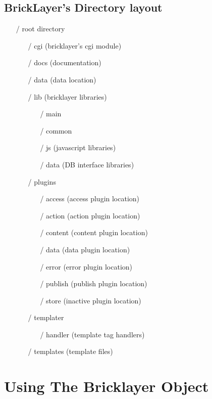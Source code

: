 \documentclass[letterpaper,10pt,oneside]{book}
\begin{document}
\subsection{BrickLayer's Directory layout}
\begin{itemize}
\item[/] root directory
\begin{itemize}
\item[/] cgi (bricklayer's cgi module)
\item[/] docs (documentation)
\item[/] data (data location)
\item[/] lib (bricklayer libraries)
	\begin{itemize}
		\item[/] main
		\item[/] common
		\item[/] js (javascript libraries)
		\item[/] data (DB interface libraries)
	\end{itemize}
\item[/] plugins
	\begin{itemize}
		\item[/] access (access plugin location)
		\item[/] action (action plugin location)
		\item[/] content (content plugin location)
		\item[/] data (data plugin location)
		\item[/] error (error plugin location)
		\item[/] publish (publish plugin location)
		\item[/] store (inactive plugin location)
	\end{itemize}
\item[/] templater
	\begin{itemize}
		\item[/] handler (template tag handlers)
	\end{itemize}
\item[/] templates (template files)
\end{itemize}
\end{itemize}
\section{Using The Bricklayer Object}
\end{document}
